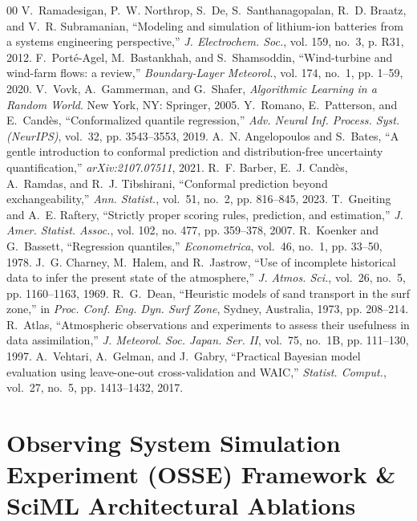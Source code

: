 \documentclass[journal]{IEEEtran}
\begin{document}
\begin{thebibliography}{00}
 V.~Ramadesigan, P.~W. Northrop, S.~De, S.~Santhanagopalan, R.~D. Braatz, and V.~R. Subramanian, ``Modeling and simulation of lithium-ion batteries from a systems engineering perspective,'' \textit{J. Electrochem. Soc.}, vol. 159, no.~3, p. R31, 2012.
 F.~Port{\'e}-Agel, M.~Bastankhah, and S.~Shamsoddin, ``Wind-turbine and wind-farm flows: a review,'' \textit{Boundary-Layer Meteorol.}, vol. 174, no.~1, pp. 1--59, 2020.
 V.~Vovk, A.~Gammerman, and G.~Shafer, \textit{Algorithmic Learning in a Random World}. New York, NY: Springer, 2005.
 Y.~Romano, E.~Patterson, and E.~Cand{\`e}s, ``Conformalized quantile regression,'' \textit{Adv. Neural Inf. Process. Syst. (NeurIPS)}, vol.~32, pp. 3543--3553, 2019.
 A.~N. Angelopoulos and S.~Bates, ``A gentle introduction to conformal prediction and distribution-free uncertainty quantification,'' \textit{arXiv:2107.07511}, 2021.
 R.~F. Barber, E.~J. Cand{\`e}s, A.~Ramdas, and R.~J. Tibshirani, ``Conformal prediction beyond exchangeability,'' \textit{Ann. Statist.}, vol.~51, no.~2, pp. 816--845, 2023.
 T.~Gneiting and A.~E. Raftery, ``Strictly proper scoring rules, prediction, and estimation,'' \textit{J. Amer. Statist. Assoc.}, vol. 102, no. 477, pp. 359--378, 2007.
 R.~Koenker and G.~Bassett, ``Regression quantiles,'' \textit{Econometrica}, vol.~46, no.~1, pp. 33--50, 1978.
 J.~G. Charney, M.~Halem, and R.~Jastrow, ``Use of incomplete historical data to infer the present state of the atmosphere,'' \textit{J. Atmos. Sci.}, vol.~26, no.~5, pp. 1160--1163, 1969.
 R.~G.~Dean, ``Heuristic models of sand transport in the surf zone,'' in \textit{Proc. Conf. Eng. Dyn. Surf Zone}, Sydney, Australia, 1973, pp. 208--214.
 R.~Atlas, ``Atmospheric observations and experiments to assess their usefulness in data assimilation,'' \textit{J. Meteorol. Soc. Japan. Ser. II}, vol.~75, no.~1B, pp. 111--130, 1997.
 A.~Vehtari, A.~Gelman, and J.~Gabry, ``Practical Bayesian model evaluation using leave-one-out cross-validation and WAIC,'' \textit{Statist. Comput.}, vol.~27, no.~5, pp. 1413--1432, 2017.
\end{thebibliography}

\appendices

\section{Observing System Simulation Experiment (OSSE) Framework \& SciML Architectural Ablations}
\label{sec:appendix_osse}
\end{document}

